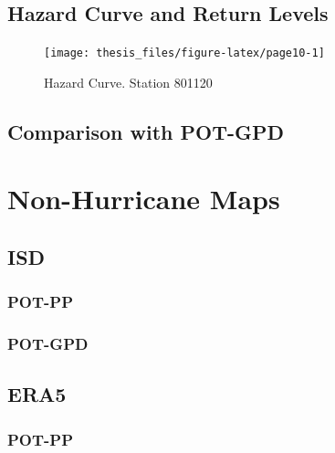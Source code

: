 \documentclass[12pt,oneside]{reedthesis}
\begin{document}
\hypertarget{hazard-curve-and-return-levels}{%
\subsection{Hazard Curve and Return Levels}\label{hazard-curve-and-return-levels}}

\footnotesize
\begin{figure}

{\centering \texttt{[image: thesis\_files/figure-latex/page10-1]} 

}

\caption{Hazard Curve. Station 801120}\label{fig:page10}
\end{figure}
\normalsize

\hypertarget{comparison-with-pot-gpd}{%
\subsection{Comparison with POT-GPD}\label{comparison-with-pot-gpd}}

\hypertarget{non-hurricane-maps}{%
\section{Non-Hurricane Maps}\label{non-hurricane-maps}}

\hypertarget{isd-1}{%
\subsection{ISD}\label{isd-1}}

\hypertarget{pot-pp-1}{%
\subsubsection{POT-PP}\label{pot-pp-1}}

\hypertarget{pot-gpd-1}{%
\subsubsection{POT-GPD}\label{pot-gpd-1}}

\hypertarget{era5-1}{%
\subsection{ERA5}\label{era5-1}}

\hypertarget{pot-pp-2}{%
\subsubsection{POT-PP}\label{pot-pp-2}}
\end{document}
